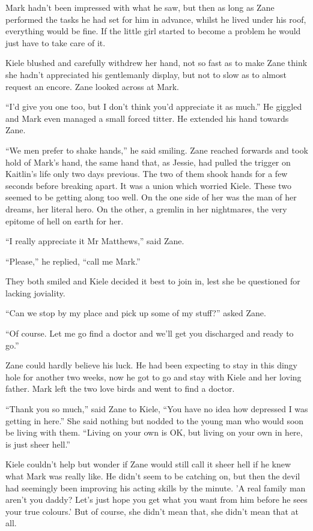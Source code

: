 Mark hadn't been impressed with what he saw, but then as long as Zane performed the tasks he had set for him in advance, whilst he lived under his roof, everything would be fine.  If the little girl started to become a problem he would just have to take care of it.  

Kiele blushed and carefully withdrew her hand, not so fast as to make Zane think she hadn't appreciated his gentlemanly display, but not to slow as to almost request an encore.  Zane looked across at Mark.

``I'd give you one too, but I don't think you'd appreciate it as much.''  He giggled and Mark even managed a small forced titter.  He extended his hand towards Zane.

``We men prefer to shake hands,'' he said smiling.  Zane reached forwards and took hold of Mark's hand, the same hand that, as Jessie, had pulled the trigger on Kaitlin's life only two days previous.  The two of them shook hands for a few seconds before breaking apart.  It was a union which worried Kiele.  These two seemed to be getting along too well.  On the one side of her was the man of her dreams, her literal hero.  On the other, a gremlin in her nightmares, the very epitome of hell on earth for her.

``I really appreciate it Mr Matthews,'' said Zane.

``Please,'' he replied, ``call me Mark.''

They both smiled and Kiele decided it best to join in, lest she be questioned for lacking joviality.  

``Can we stop by my place and pick up some of my stuff?'' asked Zane.

``Of course.  Let me go find a doctor and we'll get you discharged and ready to go.''  

Zane could hardly believe his luck.  He had been expecting to stay in this dingy hole for another two weeks, now he got to go and stay with Kiele and her loving father.  Mark left the two love birds and went to find a doctor.  

``Thank you so much,'' said Zane to Kiele, ``You have no idea how depressed I was getting in here.''  She said nothing but nodded to the young man who would soon be living with them.  ``Living on your own is OK, but living on your own in here, is just sheer hell.''

Kiele couldn't help but wonder if Zane would still call it sheer hell if he knew what Mark was really like.  He didn't seem to be catching on, but then the devil had seemingly been improving his acting skills by the minute.  'A real family man aren't you daddy?  Let's just hope you get what you want from him before he sees your true colours.'  But of course, she didn't mean that, she didn't mean that at all.

